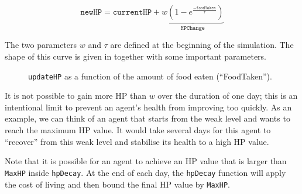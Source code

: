 \begin{equation}\label{updateHP_general}
   \texttt{newHP}= \texttt{currentHP} +\underbrace{w(1-e^{\frac{-\texttt{foodTaken}}{\tau}})}_{\texttt{HPChange}}
\end{equation}

The two parameters $w$ and $\tau$ are defined at the beginning of the simulation. The shape of this curve is given in  together with some important parameters.

\begin{figure}[htb]%
    \centering
    \qquad
    \caption{\texttt{updateHP} as a function of the amount of food eaten (``FoodTaken'').}%
    \label{fig:updateHP}%
\end{figure}

It is not possible to gain more HP than $w$ over the duration of one day; this is an intentional limit to prevent an agent's health from improving too quickly. As an example, we can think of an agent that starts from the weak level and wants to reach the maximum HP value. It would take several days for this agent to ``recover'' from this weak level and stabilise its health to a high HP value. 

Note that it is possible for an agent to achieve an HP value that is larger than \texttt{MaxHP} inside \lstinline$hpDecay$. At the end of each day, the \lstinline$hpDecay$ function will apply the cost of living and then bound the final HP value by \lstinline$MaxHP$.


